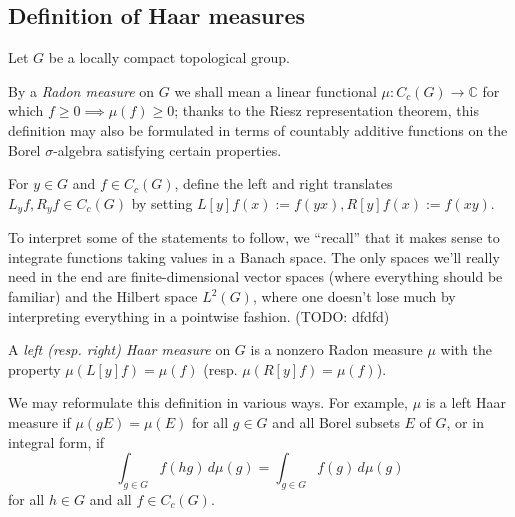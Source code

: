 \documentclass[reqno]{amsart} 
\begin{document}
\subsection{Definition of Haar measures}
\label{sec:org171fce1}
Let $G$ be a locally compact topological group.
\begin{definition}
  By a \emph{Radon measure} on $G$ we shall mean a linear
  functional $\mu : C_c(G) \rightarrow \mathbb{C}$ for which
  $f \geq 0 \implies \mu(f) \geq 0$;
  thanks to the Riesz
  representation theorem, this
  definition may also be formulated in terms of
  countably additive functions on the Borel $\sigma$-algebra
  satisfying certain properties.
\end{definition}
For $y \in G$
and $f \in C_c(G)$,
define the left and right translates
$L_y f, R_y f \in C_c(G)$
by
setting $L[y] f(x) := f(y x), R[y] f(x) := f(x y)$.

To interpret some of the statements to follow,
we ``recall'' that it makes sense to integrate functions taking values in a Banach space.
The only spaces we'll really need in the end are finite-dimensional vector spaces
(where everything should be familiar)
and the Hilbert space $L^2(G)$, where one doesn't lose much
by interpreting everything in a pointwise fashion.  (TODO: dfdfd)
\begin{definition}
\label{defn:}
A \emph{left (resp. right) Haar measure} on $G$
is a nonzero Radon measure $\mu$
with the property
$\mu(L[y] f) = \mu(f)$
(resp. 
$\mu(R[y] f) = \mu(f)$).
\end{definition}
We may reformulate this definition in various ways.
For example, $\mu$ is a left Haar measure
if $\mu(g E) = \mu(E)$ for all $g \in G$
and all Borel subsets $E$ of $G$,
or in integral form, if
\begin{equation*}
  \int_{g \in G} f(h g) \, d \mu(g) = \int_{g \in G} f(g) \, d \mu(g)
\end{equation*}
for all $h \in G$ and all $f \in C_c(G)$.
\end{document}
